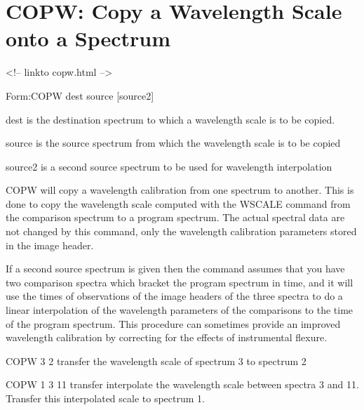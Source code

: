 \section{COPW: Copy a Wavelength Scale onto a Spectrum}
\begin{rawhtml}
<!-- linkto copw.html -->
\end{rawhtml}
\begin{command}
  \item[Form:COPW dest source {[source2]}\hfill]{}
  \item[dest]{is the destination spectrum to which a wavelength scale is to
       be copied.}
  \item[source]{is the source spectrum from which the wavelength scale is
       to be copied}
  \item[source2]{is a second source spectrum to be used for wavelength
       interpolation}
\end{command}

COPW will copy a wavelength calibration from one spectrum to another.  This
is done to copy the wavelength scale computed with the WSCALE command from
the comparison spectrum to a program spectrum.  The actual spectral data
are not changed by this command, only the wavelength calibration parameters
stored in the image header.  

If a second source spectrum is given then the command assumes that you have
two comparison spectra which bracket the program spectrum in time, and it
will use the times of observations of the image headers of the three
spectra to do a linear interpolation of the wavelength parameters of the
comparisons to the time of the program spectrum.  This procedure can
sometimes provide an improved wavelength calibration by correcting for the
effects of instrumental flexure.

\begin{example}
  \item[COPW 3 2\hfill]{transfer the wavelength scale of spectrum 3 to
       spectrum 2}

  \item[COPW 1 3 11\hfill]{transfer interpolate the wavelength scale
       between spectra 3 and 11.  Transfer this interpolated scale to
       spectrum 1.}
\end{example}

